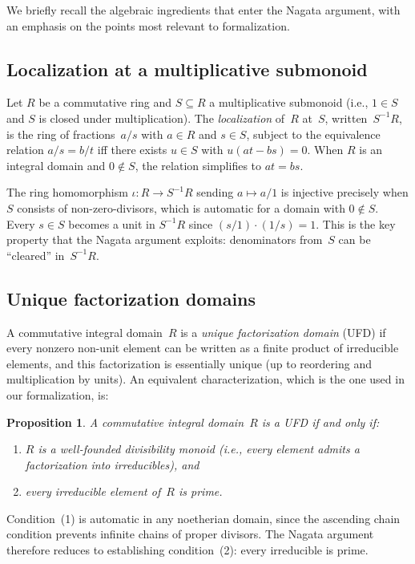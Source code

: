 \documentclass[11pt]{article}
\theoremstyle{plain}
\newtheorem{proposition}[theorem]{Proposition}
\theoremstyle{definition}
\theoremstyle{remark}
\begin{document}
We briefly recall the algebraic ingredients that enter the Nagata argument,
with an emphasis on the points most relevant to formalization.

\subsection{Localization at a multiplicative submonoid}

Let $R$ be a commutative ring and $S\subseteq R$ a multiplicative submonoid
(i.e., $1\in S$ and $S$ is closed under multiplication).  The
\emph{localization} of~$R$ at~$S$, written~$S^{-1}R$, is the ring of
fractions~$a/s$ with $a\in R$ and $s\in S$, subject to the equivalence
relation $a/s = b/t$ iff there exists $u\in S$ with $u(at-bs)=0$.  When $R$
is an integral domain and $0\notin S$, the relation simplifies to $at=bs$.

The ring homomorphism $\iota\colon R\to S^{-1}R$ sending $a\mapsto a/1$ is
injective precisely when $S$ consists of non-zero-divisors, which is automatic
for a domain with $0\notin S$.  Every $s\in S$ becomes a unit in $S^{-1}R$
since $(s/1)\cdot(1/s)=1$.  This is the key property that the Nagata argument
exploits: denominators from~$S$ can be ``cleared'' in~$S^{-1}R$.

\subsection{Unique factorization domains}

A commutative integral domain~$R$ is a \emph{unique factorization domain}
(UFD) if every nonzero non-unit element can be written as a finite product of
irreducible elements, and this factorization is essentially unique (up to
reordering and multiplication by units).  An equivalent characterization, which
is the one used in our formalization, is:

\begin{proposition}\label{prop:ufd-char}
A commutative integral domain~$R$ is a UFD if and only if:
\begin{enumerate}[nosep]
\item $R$ is a well-founded divisibility monoid \textup{(}i.e., every element
  admits a factorization into irreducibles\textup{)}, and
\item every irreducible element of~$R$ is prime.
\end{enumerate}
\end{proposition}

\noindent
Condition~(1) is automatic in any noetherian domain, since the ascending chain
condition prevents infinite chains of proper divisors.  The Nagata argument
therefore reduces to establishing condition~(2): every irreducible is prime.
\end{document}

